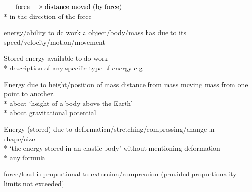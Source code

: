 \begin{question}%

  $\text{\refterm{force}} \times \text{distance moved (by force)}$~\hfill{}\\*
  in the direction of the force~\hfill{}
\end{question}

\begin{question}%

  energy/ability to do work a object/body/mass has due to its speed\allowbreak/velocity\allowbreak/motion\allowbreak/movement~\hfill{}
\end{question}

\begin{question}%

  Stored energy available to do work~\hfill{}\\*
  \NOT description of any specific type of energy e.g. 
\end{question}

\begin{question}%

  Energy due to height/position of mass \OR distance from mass \OR
  moving mass from one point to another.~\hfill{}\\*
  \NOT about `height of a body above the Earth'\\*
  \NOT about gravitational potential
\end{question}

\begin{question}%

  Energy (stored) due to deformation/stretching/compressing/change in shape/size~\hfill{}\\*
  \NOT `the energy stored in an elastic body' without mentioning deformation\\*
  \NOT any formula
\end{question}


\begin{question}%

  force/load is proportional to extension/compression (provided proportionality limits not exceeded)~\hfill{}
\end{question}

